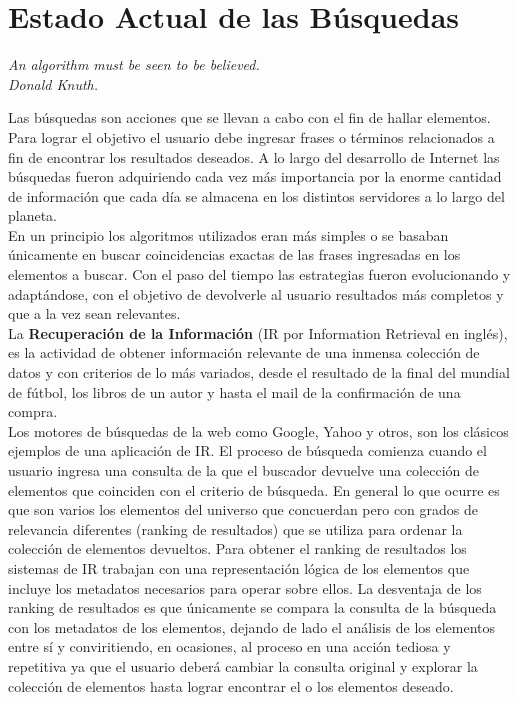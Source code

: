 \section{Estado Actual de las Búsquedas}
{\begin{small}%
\begin{flushright}%
\it An algorithm must be seen to be believed.\\Donald Knuth.
\end{flushright}%
\end{small}%
\vspace{.5cm}}
Las búsquedas son acciones que se llevan a cabo con el fin de hallar elementos. Para lograr el objetivo el usuario debe ingresar frases o términos relacionados a fin de encontrar los resultados deseados. A lo largo del desarrollo de Internet las búsquedas fueron adquiriendo cada vez más importancia por la enorme cantidad de información que cada día se almacena en los distintos servidores a lo largo del planeta.\\
En un principio los algoritmos utilizados eran más simples o se basaban únicamente en buscar coincidencias exactas de las frases ingresadas en los elementos a buscar. Con el paso del tiempo las estrategias fueron evolucionando y adaptándose, con el objetivo de devolverle al usuario resultados más completos y que a la vez sean relevantes.\\
La \textbf{Recuperación de la Información} (IR por Information Retrieval en inglés), es la actividad de obtener información relevante de una inmensa colección de datos y con criterios de lo más variados, desde el resultado de la final del mundial de fútbol, los libros de un autor y hasta el mail de la confirmación de una compra.\\
Los motores de búsquedas de la web como Google, Yahoo y otros, son los clásicos ejemplos de una aplicación de IR. El proceso de búsqueda comienza cuando el usuario ingresa una consulta de la que el buscador devuelve una colección de elementos que coinciden con el criterio de búsqueda. En general lo que ocurre es que son varios los elementos del universo que concuerdan pero con grados de relevancia diferentes (ranking de resultados) que se utiliza para ordenar la colección de elementos devueltos. Para obtener el ranking de resultados los sistemas de IR trabajan con una representación lógica de los elementos que incluye los metadatos necesarios para operar sobre ellos. La desventaja de los ranking de resultados es que únicamente se compara la consulta de la búsqueda con los metadatos de los elementos, dejando de lado el análisis de los elementos entre sí y conviritiendo, en ocasiones, al proceso en una acción tediosa y repetitiva ya que el usuario deberá cambiar la consulta original y explorar la colección de elementos hasta lograr encontrar el o los elementos deseado.\\
